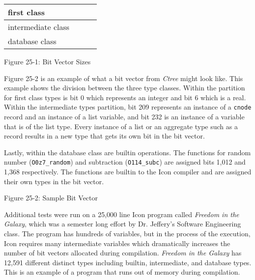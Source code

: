 \begin{center}
\tabletail{}
\tablelasttail{}
\begin{supertabular}{|m{1.2191598in}|m{1.1629599in}|m{1.2455599in}|m{1.6080599in}|}
\hline
 first class &
 &
 &
\raggedleft{}\\\hline
 intermediate class &
 &
 &
\raggedleft{}\\\hline
 database class &
 &
 &
\raggedleft{}\\\hline
\end{supertabular}
\end{center}
{\centering{}
Figure 25-1: Bit Vector Sizes
\par}


Figure 25-2 is an example of what a bit vector from \textit{Ctree}
might look like. This example shows the division between the three
type classes. Within the partition for first class types is bit 0
which represents an integer and bit 6 which is a real. Within the
intermediate types partition, bit 209 represents an instance of a
\texttt{cnode} record and an instance of a list variable, and bit 232
is an instance of a variable that is of the list type. Every instance
of a list or an aggregate type such as a record results in a new type
that gets its own bit in the bit vector.

Lastly, within the database class are builtin operations. The
functions for random number (\texttt{O0z7\_random}) and subtraction
(\texttt{O114\_subc}) are assigned bits 1,012 and 1,368
respectively. The functions are builtin to the Icon compiler and are
assigned their own types in the bit vector.

\bigskip

{\centering{}
Figure 25-2: Sample Bit Vector
\par}

Additional tests were run on a 25,000 line Icon program called
\textit{Freedom in the Galaxy}, which was a semester long effort by
Dr. Jeffery's Software Engineering class. The program has hundreds of
variables, but in the process of the execution, Icon requires many
intermediate variables which dramatically increases the number of bit
vectors allocated during compilation. \textit{Freedom in the Galaxy}
has 12,591 different distinct types including builtin, intermediate,
and database types. This is an example of a program that runs out of
memory during compilation.

